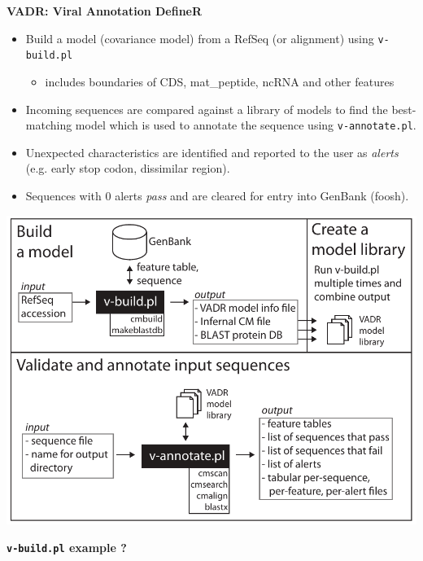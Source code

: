 \documentclass[landscape]{slides}
\begin{document}
\begin{slide}
\begin{center}
\textbf{VADR: Viral Annotation DefineR}

\begin{itemize}
\item Build a model (covariance model) from a RefSeq (or alignment) using \texttt{v-build.pl}
\begin{itemize}
  \item includes boundaries of CDS, mat\_peptide, ncRNA and other features
\end{itemize}

\item Incoming sequences are compared against a library of models to find
  the best-matching model which is used to annotate the sequence using
  \texttt{v-annotate.pl}.

\item Unexpected characteristics are identified and reported to the
  user as \emph{alerts} (e.g. early stop codon, dissimilar
  region). 

\item Sequences with 0 alerts \emph{pass} and are cleared for
  entry into GenBank (foosh).
\end{itemize}

\includegraphics[width=6in]{figs/vadr}
\end{center}
\vfill
\end{slide}
\begin{slide}
\begin{center}
\textbf{\texttt{v-build.pl} example ? }
\end{center}

\vfill
\end{slide}
\end{document}
